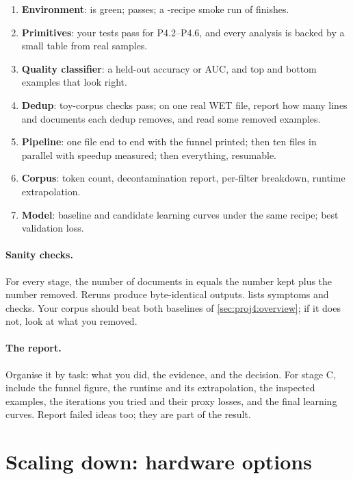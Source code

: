 \begin{enumerate}
  \item \textbf{Environment}:  is green;  passes; a
        -recipe smoke run of  finishes.
  \item \textbf{Primitives}: your tests pass for P4.2--P4.6, and every analysis is backed by a small table
        from real samples.
  \item \textbf{Quality classifier}: a held-out accuracy or AUC, and top and bottom examples that look right.
  \item \textbf{Dedup}: toy-corpus checks pass; on one real WET file, report how many lines and documents
        each dedup removes, and read some removed examples.
  \item \textbf{Pipeline}: one file end to end with the funnel printed; then ten files in parallel with
        speedup measured; then everything, resumable.
  \item \textbf{Corpus}: token count, decontamination report, per-filter breakdown, runtime extrapolation.
  \item \textbf{Model}: baseline and candidate learning curves under the same recipe; best validation loss.
\end{enumerate}

\paragraph{Sanity checks.} For every stage, the number of documents in equals the number kept plus the number removed. Reruns
produce byte-identical outputs.  lists symptoms and checks. Your corpus should
beat both baselines of \cref{sec:proj4:overview}; if it does not, look at what you removed.

\paragraph{The report.} Organise it by task: what you did, the evidence, and the decision. For stage C,
include the funnel figure, the runtime and its extrapolation, the inspected examples, the iterations
you tried and their proxy losses, and the final learning curves. Report failed ideas too; they are part
of the result.

\section{Scaling down: hardware options}\label{sec:proj4:outside}

